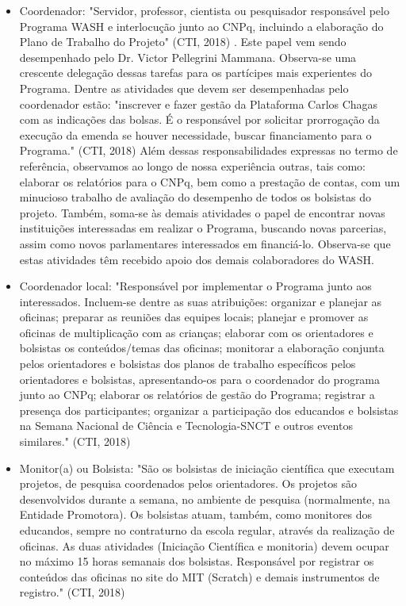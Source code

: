 \begin{itemize}
\item Coordenador: "Servidor, professor, cientista ou pesquisador responsável pelo Programa WASH e interlocução junto ao CNPq, incluindo a elaboração do Plano de Trabalho do Projeto"  (CTI, 2018) . Este papel vem sendo desempenhado pelo Dr. Victor Pellegrini Mammana. Observa-se uma crescente delegação dessas tarefas para os partícipes mais experientes do Programa. Dentre as atividades que devem ser desempenhadas pelo coordenador estão: "inscrever e fazer gestão da Plataforma Carlos Chagas com as indicações das bolsas. É o responsável por solicitar prorrogação da execução da emenda se houver necessidade, buscar financiamento para o Programa."  (CTI, 2018) Além dessas responsabilidades expressas no termo de referência, observamos ao longo de nossa experiência outras, tais como: elaborar os relatórios para o CNPq, bem como a prestação de contas, com um minucioso trabalho de avaliação do desempenho de todos os bolsistas do projeto. Também, soma-se às demais atividades o papel de encontrar novas instituições interessadas em realizar o Programa, buscando novas parcerias, assim como novos parlamentares interessados em financiá-lo. Observa-se que estas atividades têm recebido apoio dos demais colaboradores do WASH.
\item Coordenador local: "Responsável por implementar o Programa junto aos interessados. Incluem-se dentre as suas atribuições: organizar e planejar as oficinas; preparar as reuniões das equipes locais; planejar e promover as oficinas de multiplicação com as crianças; elaborar com os orientadores e bolsistas os conteúdos/temas das oficinas; monitorar a elaboração conjunta pelos orientadores e bolsistas dos planos de trabalho específicos pelos orientadores e bolsistas, apresentando-os para o coordenador do programa junto ao CNPq; elaborar os relatórios de gestão do Programa; registrar a presença dos participantes; organizar a participação dos educandos e bolsistas na Semana Nacional de Ciência e Tecnologia-SNCT e outros eventos similares."  (CTI, 2018)
\item Monitor(a) ou Bolsista: "São os bolsistas de iniciação científica que executam projetos, de pesquisa coordenados pelos orientadores. Os projetos são desenvolvidos durante a semana, no ambiente de pesquisa (normalmente, na Entidade Promotora). Os bolsistas atuam, também, como monitores dos educandos, sempre no contraturno da escola regular, através da realização de oficinas. As duas atividades (Iniciação Científica e monitoria) devem ocupar no máximo 15 horas semanais dos bolsistas. Responsável por registrar os conteúdos das oficinas no site do MIT (Scratch) e demais instrumentos de registro."  (CTI, 2018)

\end{itemize}
